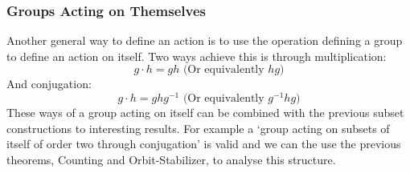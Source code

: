 \subsubsection{Groups Acting on Themselves}
Another general way to define an action is to use the operation defining a group to define an action on itself.
Two ways achieve this is through multiplication:
\[g\cdot h = gh \text{ (Or equivalently $hg$)}\]
And conjugation:
\[g\cdot h = ghg^{-1} \text{ (Or equivalently $g^{-1}hg$)}\]
These ways of a group acting on itself can be combined with the previous subset constructions to interesting results.
For example a `group acting on subsets of itself of order two through conjugation' is valid and we can the use the previous theorems, Counting and Orbit-Stabilizer, to analyse this structure.
